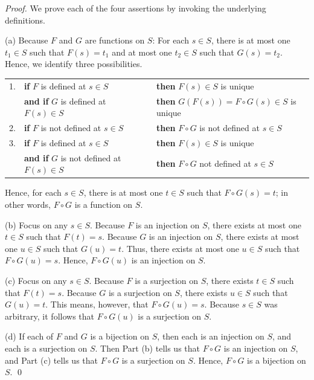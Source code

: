 \begin{proof}
We prove each of the four assertions by invoking the underlying
definitions.

\noindent (a)
%
Because $F$ and $G$ are functions on $S$: For each $s \in S$, there is
at most one $t_1 \in S$ such that $F(s) = t_1$ and at most one $t_2
\in S$ such that $G(s) = t_2$.  Hence, we identify three
possibilities.

\smallskip

\begin{tabular}{lllll}
1. &
{\bf if}
$F$ is defined at $s \in S$  & & & {\bf then} $F(s) \in S$ is unique \\
  &
{\bf and if} $G$ is defined at $F(s) \in S$ & & & {\bf then} $G(F(s))
= F \circ G(s) \in S$ is unique \\
2. &
{\bf if}
$F$ is not defined at $s \in S$ & & & {\bf then} $F \circ G$ is not
defined at $s \in S$ \\
3. & 
{\bf if}
$F$ is defined at $s \in S$ & & & {\bf then} $F(s) \in S$ is unique \\
  &
{\bf and if} $G$ is not defined at $F(s) \in S$ & & & {\bf then}
$F \circ G$ not defined at $s \in S$ %
\end{tabular}

\smallskip

\noindent
Hence, for each $s \in S$, there is at most one $t \in S$ such that $F
\circ G(s) = t$; in other words, $F \circ G$ is a function on $S$.

\medskip

\noindent (b)
%
Focus on any $s \in S$.  Because $F$ is an injection on $S$, there
exists at most one $t \in S$ such that $F(t) = s$.  Because $G$ is an
injection on $S$, there exists at most one $u \in S$ such that $G(u) =
t$.  Thus, there exists at most one $u \in S$ such that $F \circ G(u)
= s$.  Hence, $F \circ G(u)$ is an injection on $S$.

\medskip

\noindent (c)
%
Focus on any $s \in S$.  Because $F$ is a surjection on $S$, there
exists $t \in S$ such that $F(t) = s$.  Because $G$ is a surjection on
$S$, there exists $u \in S$ such that $G(u) = t$.  This means,
however, that $F \circ G(u) = s$.  Because $s \in S$ was arbitrary, it
follows that $F \circ G(u)$ is a surjection on $S$.

\medskip

\noindent (d)
%
If each of $F$ and $G$ is a bijection on $S$, then each is an
injection on $S$, and each is a surjection on $S$.  Then Part (b)
tells us that $F \circ G$ is an injection on $S$, and Part (c) tells
us that $F \circ G$ is a surjection on $S$.  Hence, $F \circ G$ is a
bijection on $S$.  \qed
\end{proof}

